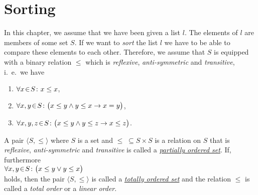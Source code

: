 \chapter{Sorting}
In this chapter, we assume that we have been given a list $l$.  The elements of $l$ are members of
some set $S$.  If we want to \emph{sort} the list $l$ we have to be able to compare these elements
to each other.   Therefore, we assume that $S$ is equipped with a binary relation $\leq$ which is
\emph{reflexive}, \emph{anti-symmetric} and \emph{transitive}, i.~e.~we have  
\begin{enumerate}
\item $\forall x \!\in\! S \colon x \leq x$,
\item $\forall x, y \!\in\! S \colon \bigl(x \leq y \wedge y \leq x
  \rightarrow x = y\bigr)$, 
\item $\forall x, y, z \!\in\! S \colon \bigl(x \leq y \wedge y \leq z \rightarrow x \leq z\bigr)$. 
\end{enumerate}
A pair $\langle S, \leq \rangle$ where $S$ is a set and $\leq \;\subseteq S \times S$ is a relation
on $S$ that is \emph{reflexive}, \emph{anti-symmetric} and \emph{transitive} is called a
\href{http://en.wikipedia.org/wiki/Partially_ordered_set}{\emph{partially ordered set}}.  
If, furthermore
\\[0.2cm]
\hspace*{1.3cm}
$\forall x, y \!\in\! S \colon\bigl( x \leq y \vee y \leq x\bigr)$
\\[0.2cm]
holds, then the pair $\langle S, \leq \rangle$ is called a 
\href{http://en.wikipedia.org/wiki/Totally_ordered_set}{\emph{totally ordered set}} and
the relation $\leq$ is called a \emph{total order} or a \emph{linear order}.


